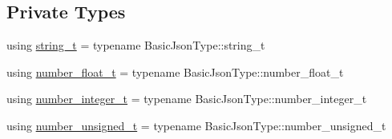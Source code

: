 \subsection*{Private Types}
\begin{DoxyCompactItemize}
\item 
using \hyperlink{classnlohmann_1_1detail_1_1serializer_ad08aa54fac1dd0a453320c54137d45ba}{string\+\_\+t} = typename Basic\+Json\+Type\+::string\+\_\+t
\item 
using \hyperlink{classnlohmann_1_1detail_1_1serializer_a460c6794fbabbb2ae83380e987a6c030}{number\+\_\+float\+\_\+t} = typename Basic\+Json\+Type\+::number\+\_\+float\+\_\+t
\item 
using \hyperlink{classnlohmann_1_1detail_1_1serializer_ae7b1df1c70bdec1371f297567726a198}{number\+\_\+integer\+\_\+t} = typename Basic\+Json\+Type\+::number\+\_\+integer\+\_\+t
\item 
using \hyperlink{classnlohmann_1_1detail_1_1serializer_a16c7b7a726a38ff0c06dce7ba7968391}{number\+\_\+unsigned\+\_\+t} = typename Basic\+Json\+Type\+::number\+\_\+unsigned\+\_\+t
\end{DoxyCompactItemize}
